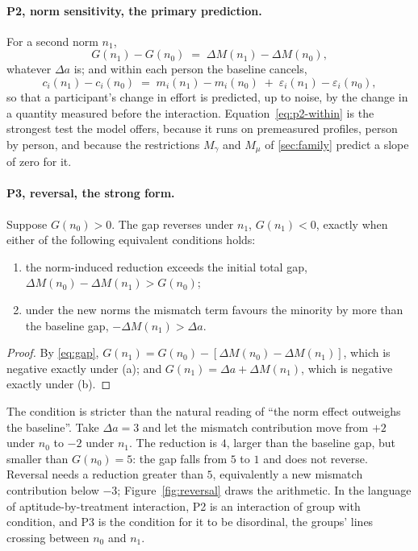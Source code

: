 \paragraph{P2, norm sensitivity, the primary prediction.} For a second norm $n_1$,
\begin{equation}
\label{eq:p2-group}
G(n_1) - G(n_0) \;=\; \Delta M(n_1) - \Delta M(n_0),
\end{equation}
whatever $\Delta a$ is; and within each person the baseline cancels,
\begin{equation}
\label{eq:p2-within}
c_i(n_1) - c_i(n_0) \;=\; m_i(n_1) - m_i(n_0) \;+\; \varepsilon_i(n_1) - \varepsilon_i(n_0),
\end{equation}
so that a participant's change in effort is predicted, up to noise, by the change in a quantity measured before the interaction. Equation~\eqref{eq:p2-within} is the strongest test the model offers, because it runs on premeasured profiles, person by person, and because the restrictions $M_\gamma$ and $M_\mu$ of \autoref{sec:family} predict a slope of zero for it.

\paragraph{P3, reversal, the strong form.}
\begin{proposition}
\label{prop:reversal}
Suppose $G(n_0) > 0$. The gap reverses under $n_1$, $G(n_1) < 0$, exactly when either of the following equivalent conditions holds:
\begin{enumerate}[label=(\alph*), leftmargin=*, nosep]
\item the norm-induced reduction exceeds the initial total gap, $\Delta M(n_0) - \Delta M(n_1) > G(n_0)$;
\item under the new norms the mismatch term favours the minority by more than the baseline gap, $-\Delta M(n_1) > \Delta a$.
\end{enumerate}
\end{proposition}
\begin{proof}
By \eqref{eq:gap}, $G(n_1) = G(n_0) - [\Delta M(n_0) - \Delta M(n_1)]$, which is negative exactly under (a); and $G(n_1) = \Delta a + \Delta M(n_1)$, which is negative exactly under (b).
\end{proof}

\noindent The condition is stricter than the natural reading of ``the norm effect outweighs the baseline''. Take $\Delta a = 3$ and let the mismatch contribution move from $+2$ under $n_0$ to $-2$ under $n_1$. The reduction is $4$, larger than the baseline gap, but smaller than $G(n_0) = 5$: the gap falls from $5$ to $1$ and does not reverse. Reversal needs a reduction greater than $5$, equivalently a new mismatch contribution below $-3$; Figure~\ref{fig:reversal} draws the arithmetic. In the language of aptitude-by-treatment interaction, P2 is an interaction of group with condition, and P3 is the condition for it to be disordinal, the groups' lines crossing between $n_0$ and $n_1$.

